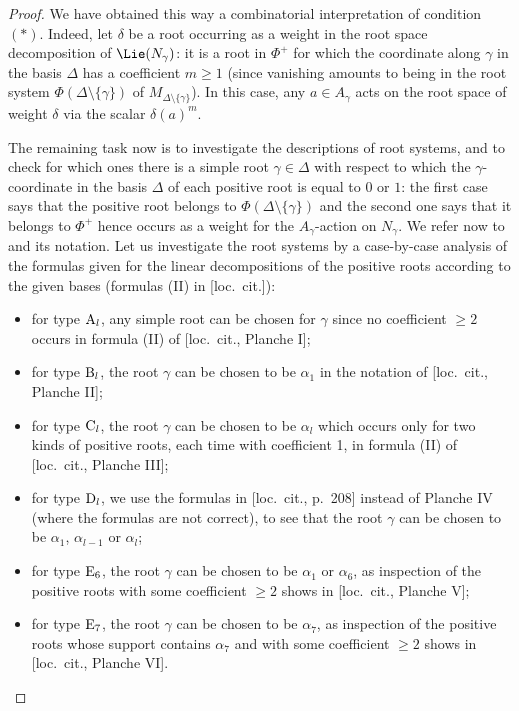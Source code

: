 \begin{proof}
We have obtained this way a combinatorial interpretation of condition $(*)$. Indeed, let $\delta$ be a root occurring as a weight in the root space decomposition of $\Lie(N_\gamma)$: it is a root in $\Phi^+$ for which the coordinate along $\gamma$ in the basis $\Delta$ has a coefficient $m
\geqslant 1$ (since vanishing amounts to being in the root system $\Phi(\Delta \setminus \{ \gamma \})$ of $M_{\Delta \setminus \{\gamma \}}$). In this case, any $a \in A_\gamma$ acts on the root space of weight $\delta$ via the scalar $\delta(a)^m$.

The remaining task now is to investigate the descriptions of root systems, and to check for which ones there is a simple root $\gamma \in \Delta$ with respect to which the $\gamma$-coordinate in the basis $\Delta$ of each positive root is equal to $0$ or $1$: the first case says that the positive root belongs to $\Phi(\Delta \setminus \{ \gamma \})$ and the second one says that it belongs to $\Phi^+$ hence occurs as a weight for the $A_\gamma$-action on $N_\gamma$. We refer now to~\cite[Planches]{BBK-Lie-4to6} and its notation. Let us investigate the root systems by a case-by-case analysis of the formulas given for the linear decompositions of the positive roots according to the given bases (formulas (II) in [loc.~cit.]):
\begin{itemize}
\item for type ${\rm A}_l$, any simple root can be chosen for $\gamma$ since no coefficient $\geqslant 2$ occurs in formula (II) of [loc.~cit., Planche I];
\item for type ${\rm B}_l$, the root $\gamma$ can be chosen to be $\alpha_1$ in the notation of [loc.~cit., Planche II];
\item for type ${\rm C}_l$, the root $\gamma$ can be chosen to be $\alpha_l$ which occurs only for two kinds of positive roots, each time with coefficient 1, in formula (II) of [loc.~cit., Planche III];
\item for type ${\rm D}_l$, we use the formulas in [loc.~cit., p.~208] instead of Planche IV (where the formulas are not correct), to see that the root $\gamma$ can be chosen to be $\alpha_1$, $\alpha_{l-1}$ or $\alpha_l$;
\item for type ${\rm E}_6$, the root $\gamma$ can be chosen to be $\alpha_1$ or $\alpha_6$, as inspection of the positive roots with some coefficient $\geqslant 2$ shows in [loc.~cit., Planche V];
\item for type ${\rm E}_7$, the root $\gamma$ can be chosen to be $\alpha_7$, as inspection of the positive roots whose support contains $\alpha_7$ and with some coefficient $\geqslant 2$ shows in [loc.~cit., Planche VI].
\end{itemize}


\end{proof}
